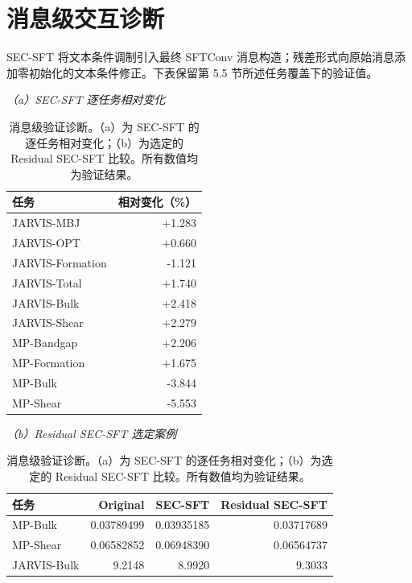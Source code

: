 \documentclass[a4paper,fleqn]{cas-sc}
\begin{document}
\section{消息级交互诊断}\label{app:message}
SEC-SFT 将文本条件调制引入最终 SFTConv 消息构造；残差形式向原始消息添加零初始化的文本条件修正。下表保留第 5.5 节所述任务覆盖下的验证值。
\begin{table}[!htbp]\caption{消息级验证诊断。（a）为 SEC-SFT 的逐任务相对变化；（b）为选定的 Residual SEC-SFT 比较。所有数值均为验证结果。}\label{tab:message_detail}\centering\scriptsize
\textit{（a）SEC-SFT 逐任务相对变化}\par\smallskip
\begin{tabular}{lr}\toprule 任务&相对变化（\%）\\\midrule
JARVIS-MBJ&+1.283\\JARVIS-OPT&+0.660\\JARVIS-Formation&-1.121\\JARVIS-Total&+1.740\\JARVIS-Bulk&+2.418\\JARVIS-Shear&+2.279\\MP-Bandgap&+2.206\\MP-Formation&+1.675\\MP-Bulk&-3.844\\MP-Shear&-5.553\\\bottomrule\end{tabular}
\par\vspace{6pt}\textit{（b）Residual SEC-SFT 选定案例}\par\smallskip
\begin{tabular}{lrrr}\toprule 任务&Original&SEC-SFT&Residual SEC-SFT\\\midrule
MP-Bulk&0.03789499&0.03935185&0.03717689\\MP-Shear&0.06582852&0.06948390&0.06564737\\JARVIS-Bulk&9.2148&8.9920&9.3033\\\bottomrule\end{tabular}\end{table}
\end{document}
